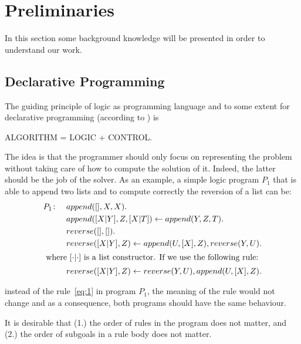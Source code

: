 \section{Preliminaries}
\label{sec:prelim}

In this section some background knowledge will be presented in order to understand our work. 

\subsection{Declarative Programming}
The guiding principle of logic as programming language and to some extent for declarative programming (according to \cite{kowalski}) is
\begin{center} 
  ALGORITHM = LOGIC + CONTROL.
\end{center}
The idea is that the programmer should only focus on representing the problem without taking care of how to compute the solution of it. Indeed, the latter should be the job of the solver. As an example, a simple logic program \(P_1\) that  is able to append two lists and to compute correctly the reversion of a list can be: 
\begin{align}
P_1 \colon \quad%
&append ([], X, X). \\
&append ([X|Y], Z, [X|T ]) \leftarrow append (Y, Z, T ). \\
&reverse([ ], [ ]).\\
&reverse([X|Y ], Z) \leftarrow append (U, [X], Z), reverse(Y, U ). \label{eq:1} \\
\intertext{
where \([\cdot|\cdot]\) is a list constructor.
If we use the following rule:}
&reverse([X|Y ], Z) \leftarrow reverse(Y, U ), append(U, [X], Z). \label{eq:2}
\end{align}

\noindent instead of the rule~\eqref{eq:1} in program \(P_1\), the meaning of the rule would not change and as a consequence, both programs should have the same behaviour. 

It is desirable that (1.) the order of rules in the program does not matter, and (2.) the order of subgoals in a rule body does not matter.

